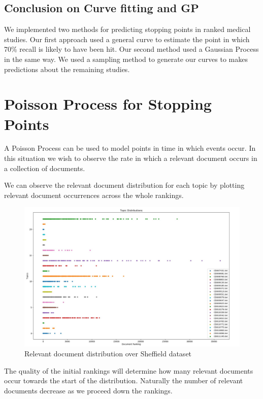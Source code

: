 \subsection{Conclusion on Curve fitting and GP} \label{conclusCurveAndGp}

We implemented two methods for predicting stopping points in ranked medical studies. Our first approach used a general curve to estimate the point in which 70\% recall is likely to have been hit. Our second method used a Gaussian Process in the same way. We used a sampling method to generate our curves to makes predictions about the remaining studies.

\fi



\section{Poisson Process for Stopping Points} \label{window_samp}

A Poisson Process can be used to model points in time in which events occur. In this situation we wish to observe the rate in which a relevant document occurs in a collection of documents.

We can observe the relevant document distribution for each topic by plotting relevant document occurrences across the whole rankings.


\begin{figure}[H]
\center
\includegraphics[width=15cm]{figures/distrib.jpg}
\caption{Relevant document distribution over Sheffield dataset}
\end{figure}

The quality of the initial rankings will determine how many relevant documents occur towards the start of the distribution. Naturally the number of relevant documents decrease as we proceed down the rankings.

